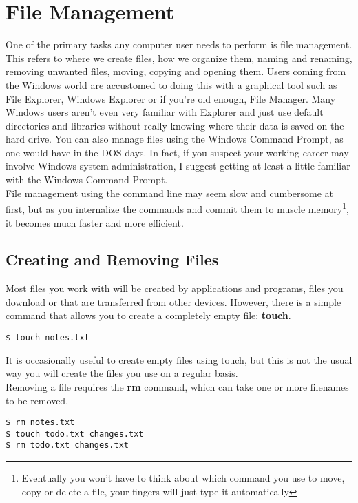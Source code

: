 \section{File Management}

One of the primary tasks any computer user needs to perform is file management.  This refers to where we create files, how we organize them, naming and renaming, removing unwanted files, moving, copying and opening them.  Users coming from the Windows world are accustomed to doing this with a graphical tool such as File Explorer, Windows Explorer or if you're old enough, File Manager.  Many Windows users aren't even very familiar with Explorer and just use default directories and libraries without really knowing where their data is saved on the hard drive.  You can also manage files using the Windows Command Prompt, as one would have in the DOS days.  In fact, if you suspect your working career may involve Windows system administration, I suggest getting at least a little familiar with the Windows Command Prompt.\\

File management using the command line may seem slow and cumbersome at first, but as you internalize the commands and commit them to muscle memory\footnote{Eventually you won't have to think about which command you use to move, copy or delete a file, your fingers will just type it automatically}, it becomes much faster and more efficient.

\subsection{Creating and Removing Files}

Most files you work with will be created by applications and programs, files you download or that are transferred from other devices.  However, there is a simple command that allows you to create a completely empty file: \textbf{touch}.

\begin{verbatim}
$ touch notes.txt
\end{verbatim}

It is occasionally useful to create empty files using touch, but this is not the usual way you will create the files you use on a regular basis.\\

Removing a file requires the \textbf{rm} command, which can take one or more filenames to be removed.

\begin{verbatim}
$ rm notes.txt
$ touch todo.txt changes.txt
$ rm todo.txt changes.txt
\end{verbatim}

